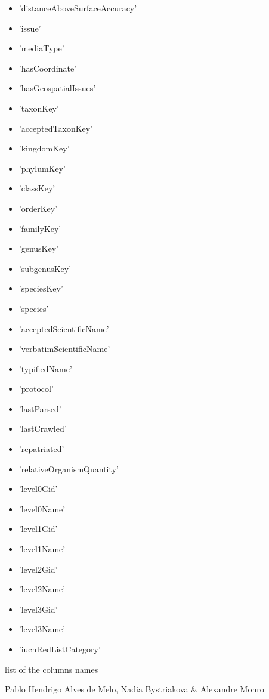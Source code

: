 \documentclass[a4paper]{book}
\begin{document}
\begin{Details}
\begin{itemize}
\item{} 'distanceAboveSurfaceAccuracy'
\item{} 'issue' 
\item{} 'mediaType' 
\item{} 'hasCoordinate' 
\item{} 'hasGeospatialIssues' 
\item{} 'taxonKey'
\item{} 'acceptedTaxonKey'
\item{} 'kingdomKey'
\item{} 'phylumKey'
\item{} 'classKey'
\item{} 'orderKey'
\item{} 'familyKey'
\item{} 'genusKey'
\item{} 'subgenusKey'
\item{} 'speciesKey'
\item{} 'species'
\item{} 'acceptedScientificName'
\item{} 'verbatimScientificName' 
\item{} 'typifiedName'
\item{} 'protocol'
\item{} 'lastParsed'
\item{} 'lastCrawled'
\item{} 'repatriated'
\item{} 'relativeOrganismQuantity'
\item{} 'level0Gid'
\item{} 'level0Name' 
\item{} 'level1Gid'
\item{} 'level1Name' 
\item{} 'level2Gid'
\item{} 'level2Name' 
\item{} 'level3Gid'
\item{} 'level3Name' 
\item{} 'iucnRedListCategory'

\end{itemize}

\end{Details}
%
\begin{Value}
list of the columns names
\end{Value}
%
\begin{Author}
Pablo Hendrigo Alves de Melo,
Nadia Bystriakova \&
Alexandre Monro
\end{Author}
\end{document}
